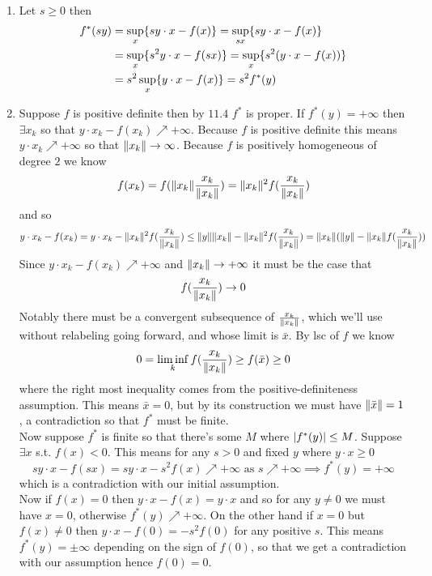 \documentclass{article}
\newenvironment{ex}[1]
  {\renewcommand\theexercise{#1}\exercise}
  {\endexercise}
\begin{document}
\begin{ex}{11.8} %
  \, \\
  \begin{enumerate}[label=(\alph*)]
    \item Let $s \ge 0$ then
      \begin{align*}
        f^*(s y) &= \sup_x \{ s y \cdot x - f(x) \} = \sup_{sx} \{ s y \cdot x - f(x) \} \\
        &= \sup_x \{ s^2 y \cdot x - f(sx) \}= \sup_x \{s^2 ( y \cdot x - f(x) ) \} \\
        & = s^2 \sup_x \{y \cdot x - f(x) \} = s^2 f^*(y)
      \end{align*}
    \item
      Suppose $f$ is positive definite then by $11.4$ $f^*$ is proper. If $f^*(y) = +\infty$ then $\exists x_k$ so that $y \cdot x_k - f(x_k) \nearrow +\infty$. Because $f$ is positive definite this means $y \cdot x_k \nearrow +\infty$ so that $\lVert x_k\rVert \to \infty$. Because $f$ is positively homogeneous of degree $2$ we know
      $$
      f(x_k) = f( \lVert x_k\rVert \frac{x_k}{\lVert x_k\rVert} ) = \lVert x_k\rVert^2 f(\frac{x_k}{\lVert x_k\rVert})
      $$
      and so
      $$
      y\cdot x_k - f(x_k) = y \cdot x_k - \lVert x_k\rVert^2 f(\frac{x_k}{\lVert x_k\rVert}) \le \lVert y\rVert \lVert x_k\rVert - \lVert x_k\rVert^2 f(\frac{x_k}{\lVert x_k\rVert}) = \lVert x_k\rVert ( \lVert y\rVert - \lVert x_k\rVert f(\frac{x_k}{\lVert x_k\rVert}) )
      $$
      Since $y \cdot x_k - f(x_k) \nearrow +\infty$ and $\lVert x_k\rVert \to +\infty$ it must be the case that
      $$
      f(\frac{x_k}{\lVert x_k\rVert}) \to 0
      $$
      Notably there must be a convergent subsequence of $\frac{x_k}{\lVert x_k\rVert}$, which we'll use without relabeling going forward, and whose limit is $\bar{x}$. By lsc of $f$ we know
      $$
      0 = \liminf_k f(\frac{x_k}{\lVert x_k\rVert}) \ge f(\bar{x}) \ge 0
      $$
      where the right most inequality comes from the positive-definiteness assumption. This means $\bar{x} = 0$, but by its construction we must have $\lVert\bar{x}\rVert = 1$, a contradiction so that $f^*$ must be finite. \, \\

      Now suppose $f^*$ is finite so that there's some $M$ where $\lvert f^*(y)\rvert \le M$. Suppose $\exists x$ s.t. $f(x) < 0$. This means for any $s > 0$ and fixed $y$ where $y \cdot x \ge 0$
      $$
      s y \cdot x - f(sx) = s y \cdot x - s^2 f(x) \nearrow +\infty \text{ as } s \nearrow +\infty \implies f^*(y) = +\infty
      $$
      which is a contradiction with our initial assumption. \, \\

      Now if $f(x) = 0$ then $y \cdot x - f(x) = y \cdot x$ and so for any $y \ne 0$ we must have $x = 0$, otherwise $f^*(y) \nearrow +\infty$. On the other hand if $x = 0$ but $f(x) \ne 0$ then $y \cdot x - f(0) = -s^2 f(0)$ for any positive $s$. This means $f^*(y) = \pm \infty$ depending on the sign of $f(0)$, so that we get a contradiction with our assumption hence $f(0) = 0$.
  \end{enumerate}
\end{ex} %
\end{document}
